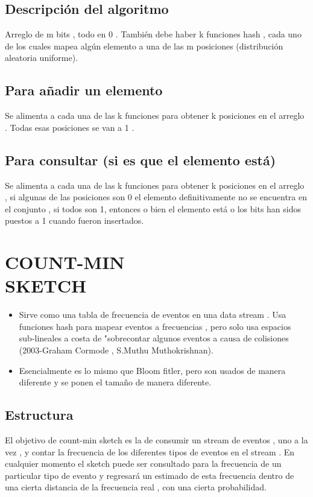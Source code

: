 \documentclass{article}
\begin{document}
\begin{multicols*}{2}
\begin{itemize}
\subsection{Descripción del algoritmo}
Arreglo de m bits , todo en 0 . También debe haber k funciones hash , cada uno de los cuales mapea algún elemento a una de las m posiciones (distribución aleatoria uniforme). 
\subsection{Para añadir un elemento}
Se alimenta a cada una de las k funciones para obtener k posiciones en el arreglo . Todas esas posiciones se van a 1 .
\subsection{Para consultar (si es que el elemento está)}
Se alimenta a cada una de las k funciones para obtener k posiciones en el arreglo , si algunas de las posiciones son 0 el elemento definitivamente no se encuentra en el conjunto , si todos son 1, entonces o bien el elemento está o los bits han sidos puestos a 1 cuando fueron insertados.
\section{COUNT-MIN \\ SKETCH}
\begin{itemize}
    \item Sirve como una tabla de frecuencia de eventos en una data stream . Usa funciones hash para mapear eventos a frecuencias , pero solo usa espacios sub-lineales a costa de "sobrecontar algunos eventos a causa de colisiones (2003-Graham Cormode , S.Muthu Muthokrishnan).
    \item Esencialmente es lo mismo que Bloom fitler, pero son usados de manera diferente y se ponen el tamaño de manera diferente.
\end{itemize}
\subsection{Estructura}
El objetivo de count-min sketch es la de consumir un stream de eventos , uno a la vez , y contar la frecuencia de los diferentes tipos de eventos en el stream . En cualquier momento el sketch puede ser consultado para la frecuencia de un particular tipo de evento y regresará un estimado de esta frecuencia dentro de una cierta distancia de la frecuencia real , con una cierta probabilidad.

\end{itemize}
\end{multicols*}
\end{document}
